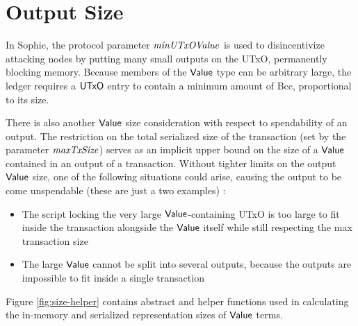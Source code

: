 \section{Output Size}
\label{sec:value-size}

In Sophie, the protocol parameter $\mathit{minUTxOValue}$ is used to
disincentivize attacking nodes by putting many small outputs on the
UTxO, permanently blocking memory. Because members of the $\mathsf{Value}$
type can be arbitrary large, the ledger requires a $\mathsf{UTxO}$ entry to
contain a minimum amount of Bcc, proportional to its size.

There is also another $\mathsf{Value}$ size consideration with respect to spendability
of an output. The restriction on the total serialized size of the transaction (set
by the parameter $\mathit{maxTxSize}$) serves as an implicit upper bound on the
size of a $\mathsf{Value}$ contained in an output of a transaction. Without tighter
limits on the output $\mathsf{Value}$ size, one of the following situations could arise,
causing the output to be come unspendable (these are just a two examples) :

\begin{itemize}
  \item The script locking the very large $\mathsf{Value}$-containing UTxO is too large
  to fit inside the transaction alongside the $\mathsf{Value}$ itself while still respecting
  the max transaction size
  \item The large $\mathsf{Value}$ cannot be split into several outputs, because the
  outputs are impossible to fit inside a single transaction
\end{itemize}

Figure \ref{fig:size-helper} contains abstract and helper functions
used in calculating the in-memory and serialized representation
sizes of $\mathsf{Value}$ terms.

